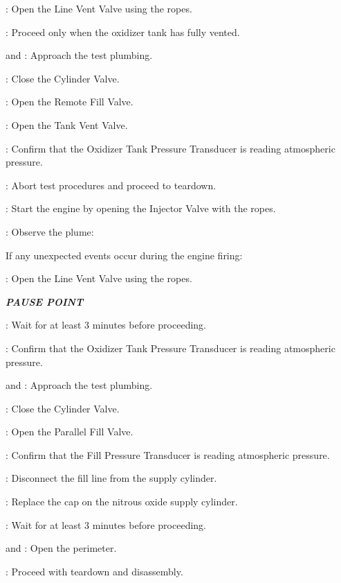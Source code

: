 \begin{checklist}
\begin{checklist}
\begin{checklist}[label=$\bullet$]
\begin{checklist}
                \item \primary: Open the Line Vent Valve using the ropes.
                \item \ops: Proceed only when the oxidizer tank has fully vented.
                \item \primary{} and \secondary: Approach the test plumbing.
                \item \primary{}: Close the Cylinder Valve.
                \item \primary{}: Open the Remote Fill Valve.
                \item \primary{}: Open the Tank Vent Valve.
                \item \daq{}: Confirm that the Oxidizer Tank Pressure Transducer is reading atmospheric pressure.
                \item \ops: Abort test procedures and proceed to teardown.
            \end{checklist}
        \end{checklist}
    \end{checklist}
    \item \primary: Start the engine by opening the Injector Valve with the ropes.
    \item \primary: Observe the plume:
    \begin{checklist}[label=$\bullet$]
        \item If any unexpected events occur during the engine firing:
        \begin{checklist}
            \item \primary{}: Open the Line Vent Valve using the ropes.
        \end{checklist}
    \end{checklist}
    \item \textbf{\textit{PAUSE POINT}}
    \item \ops{}: Wait for at least 3 minutes before proceeding.
    \item \daq{}: Confirm that the Oxidizer Tank Pressure Transducer is reading atmospheric pressure.
    \item \primary{} and \secondary: Approach the test plumbing.
    \item \primary{}: Close the Cylinder Valve.
    \item \primary{}: Open the Parallel Fill Valve.
    \item \daq{}: Confirm that the Fill Pressure Transducer is reading atmospheric pressure.
    \item \primary{}: Disconnect the fill line from the supply cylinder.
    \item \primary{}: Replace the cap on the nitrous oxide supply cylinder.
    \item \ops{}: Wait for at least 3 minutes before proceeding.
    \item \peri{} and \perii{}: Open the perimeter.
    \item \ops{}: Proceed with teardown and disassembly.


\end{checklist}


